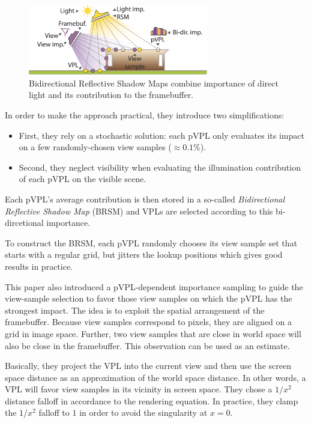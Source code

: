 \begin{figure}\label{f:adaptive-ISMs-1}
	\begin{center}
		\includegraphics[width=0.7\textwidth]{graphics/ir/ir-5-1}
	\end{center}
	\caption{Bidirectional Reflective Shadow Maps combine importance of direct light and its contribution to the framebuffer.}
\end{figure}

In order to make the approach practical, they introduce two simplifications:

\begin{itemize}
	\item First, they rely on a stochastic solution: each pVPL only evaluates its impact on a few randomly-chosen view samples ($\approx 0.1\%$).
	\item Second, they neglect visibility when evaluating the illumination contribution of each pVPL on the visible scene.
\end{itemize}

Each pVPL's average contribution is then stored in a so-called \textit{Bidirectional Reflective Shadow Map} (BRSM) and VPLs are selected according to this bi-dircetional importance.

To construct the BRSM, each pVPL randomly chooses its view sample set that starts with a regular grid, but jitters the lookup positions which gives good results in practice. 

This paper also introduced a pVPL-dependent importance sampling to guide the view-sample selection to favor those view samples on which the pVPL has the strongest impact. The idea is to exploit the spatial arrangement of the framebuffer. Because view samples correspond to pixels, they are aligned on a grid in image space. Further, two view samples that are close in world space will also be close in the framebuffer. This observation can be used as an estimate. 

Basically, they project the VPL into the current view and then use the screen space distance as an approximation of the world space distance. In other words, a VPL will favor view samples in its vicinity in screen space. They chose a $1/x^{2}$ distance falloff in accordance to the rendering equation. In practice, they clamp the $1/x^{2}$ falloff to $1$ in order to avoid the singularity at $x = 0$.

